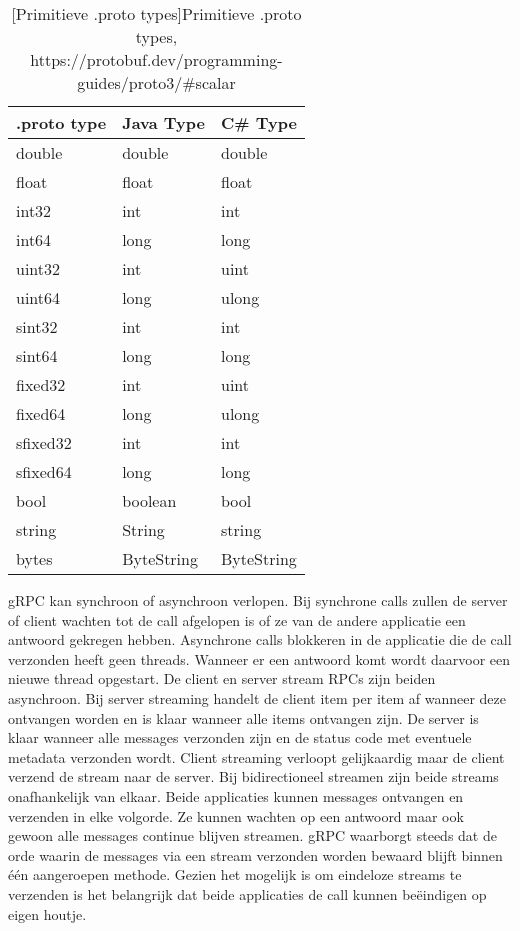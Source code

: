 \begin{table}
    \centering
    \begin{tabular}{lll}
        \toprule
        \textbf{.proto type} & \textbf{Java Type} & \textbf{C\# Type} \\
        \midrule
        double & double & double \\
        float & float & float \\
        int32 & int & int \\
        int64 & long & long \\
        uint32 & int & uint \\
        uint64 & long & ulong \\
        sint32 & int & int \\
        sint64 & long & long \\
        fixed32 & int & uint \\
        fixed64 & long & ulong \\
        sfixed32 & int & int \\
        sfixed64 & long & long \\
        bool & boolean & bool \\
        string & String & string \\
        bytes & ByteString & ByteString \\
        \bottomrule
    \end{tabular}
    \caption{[Primitieve .proto types]Primitieve .proto types,\newline
    https://protobuf.dev/programming-guides/proto3/\#scalar}
    \label{tab:Types}
\end{table}

gRPC kan synchroon of asynchroon verlopen. Bij synchrone calls zullen de server of client wachten tot de call afgelopen is of ze van de andere applicatie een antwoord gekregen hebben.
Asynchrone calls blokkeren in de applicatie die de call verzonden heeft geen threads. Wanneer er een antwoord komt wordt daarvoor een nieuwe thread opgestart.
De client en server stream RPCs zijn beiden asynchroon. Bij server streaming handelt de client item per item af wanneer deze ontvangen worden en is klaar wanneer alle items ontvangen zijn.
De server is klaar wanneer alle messages verzonden zijn en de status code met eventuele metadata verzonden wordt.
Client streaming verloopt gelijkaardig maar de client verzend de stream naar de server.
Bij bidirectioneel streamen zijn beide streams onafhankelijk van elkaar. Beide applicaties kunnen messages ontvangen en verzenden in elke volgorde.
Ze kunnen wachten op een antwoord maar ook gewoon alle messages continue blijven streamen.
gRPC waarborgt steeds dat de orde waarin de messages via een stream verzonden worden bewaard blijft binnen \'e\'en aangeroepen methode.
Gezien het mogelijk is om eindeloze streams te verzenden is het belangrijk dat beide applicaties de call kunnen be\"eindigen op eigen houtje.\newline
~\autocite{grpccoreconcepts}\\

